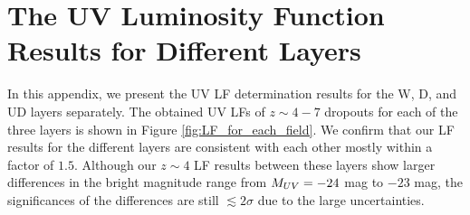 \documentclass[]{pasj01}
\begin{document}

\appendix 


\section{The UV Luminosity Function Results for Different Layers}

In this appendix, 
we present the UV LF determination results for the W, D, and UD layers separately. 
The obtained UV LFs of $z \sim 4-7$ dropouts for each of the three layers is shown in Figure \ref{fig:LF_for_each_field}. 
We confirm that 
our LF results for the different layers are consistent with each other
mostly within a factor of $1.5$. 
Although
our $z \sim 4$ LF results 
between these layers show larger differences
in the bright magnitude range from $M_{\rm UV} = -24$ mag to $-23$ mag, 
the significances of the differences are still 
$\lesssim 2 \sigma$ due to the large uncertainties. 
\end{document}
